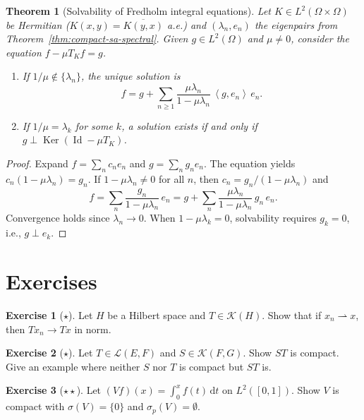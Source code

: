 \documentclass[a4paper,12pt]{book}
\DeclareMathOperator{\Id}{Id}
\DeclareMathOperator{\Ker}{Ker}
\newcommand{\dd}{\mathrm{d}}
\newcommand{\inner}[2]{\left\langle #1, #2 \right\rangle}
\newcommand{\weakto}{\rightharpoonup}
\theoremstyle{definition}
\newtheorem{exercise}{Exercise}[chapter]
\theoremstyle{plain}
\newtheorem{theorem}[definition]{Theorem}
\theoremstyle{remark}
\begin{document}
\begin{theorem}[Solvability of Fredholm integral equations]
\label{thm:fredholm-integral-solve}
Let $K \in L^2(\Omega \times \Omega)$ be Hermitian ($K(x,y) = \overline{K(y,x)}$
a.e.) and $(\lambda_n, e_n)$ the eigenpairs from Theorem~\ref{thm:compact-sa-spectral}.
Given $g \in L^2(\Omega)$ and $\mu \ne 0$, consider the equation
$f - \mu T_K f = g$.
\begin{enumerate}[label=(\roman*)]
  \item If $1/\mu \notin \{\lambda_n\}$, the unique solution is
  \[
    f = g + \sum_{n \ge 1} \frac{\mu\lambda_n}{1 - \mu\lambda_n}\, \inner{g}{e_n}\, e_n.
  \]
  \item If $1/\mu = \lambda_k$ for some $k$, a solution exists if and only if
        $g \perp \Ker(\Id - \mu T_K)$.
\end{enumerate}
\end{theorem}

\begin{proof}
Expand $f = \sum_n c_n e_n$ and $g = \sum_n g_n e_n$. The equation yields
$c_n(1 - \mu\lambda_n) = g_n$. If $1 - \mu\lambda_n \ne 0$ for all $n$,
then $c_n = g_n/(1-\mu\lambda_n)$ and
\[
  f = \sum_n \frac{g_n}{1 - \mu\lambda_n}\, e_n
  = g + \sum_n \frac{\mu\lambda_n}{1 - \mu\lambda_n}\, g_n\, e_n.
\]
Convergence holds since $\lambda_n \to 0$. When $1 - \mu\lambda_k = 0$,
solvability requires $g_k = 0$, i.e., $g \perp e_k$.
\end{proof}


\section{Exercises}

\begin{exercise}[$\star$]\label{exo:compact-weak-strong}
Let $H$ be a Hilbert space and $T \in \mathcal{K}(H)$. Show that if
$x_n \weakto x$, then $Tx_n \to Tx$ in norm.
\end{exercise}

\begin{exercise}[$\star$]\label{exo:compact-product}
Let $T \in \mathcal{L}(E,F)$ and $S \in \mathcal{K}(F,G)$. Show $ST$ is compact.
Give an example where neither $S$ nor $T$ is compact but $ST$ is.
\end{exercise}

\begin{exercise}[$\star\star$]\label{exo:volterra-compact}
Let $(Vf)(x) = \int_0^x f(t)\, \dd t$ on $L^2([0,1])$. Show $V$ is compact
with $\sigma(V) = \{0\}$ and $\sigma_p(V) = \emptyset$.
\end{exercise}
\end{document}
